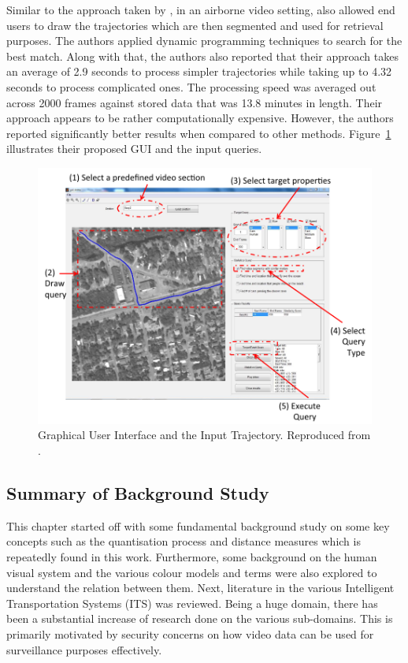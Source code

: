 Similar to the approach taken by \cite{lai2015video}, in an airborne video
setting,  also allowed end users to draw the
trajectories which are then segmented and used for retrieval purposes. The
authors applied dynamic programming techniques to search for the best match.
Along with that, the authors also reported that their approach takes an average
of 2.9 seconds to process simpler trajectories while taking up to 4.32 seconds to process complicated ones. The processing speed was averaged out across 2000
frames against stored data that was 13.8 minutes in length. Their approach appears to be rather computationally expensive. However, the authors reported significantly
better results when compared to other methods. Figure~\ref{fig:drawquery2}
illustrates their proposed GUI and the input queries.
\begin{figure}[hbt!]
  \centering
  \includegraphics[width=.6\textwidth]{image/lit/trajdraw2.PNG}
  \caption[Graphical User Interface and the Input Trajectory] {Graphical User
  Interface and the Input Trajectory. Reproduced from
  .}
\label{fig:drawquery2}
\end{figure}

\subsection{Summary of Background Study}

This chapter started off with some  fundamental background study on some key concepts such as the quantisation process and distance measures which is repeatedly found in this work. Furthermore, some background on the human visual system and the various colour models and terms were also explored to understand the relation between them. 
Next, literature in the various Intelligent Transportation Systems (ITS) was reviewed. Being a huge domain, there has been a substantial increase of research done on the various sub-domains. This is 
primarily motivated by security concerns on how video data can be used for surveillance purposes effectively.

